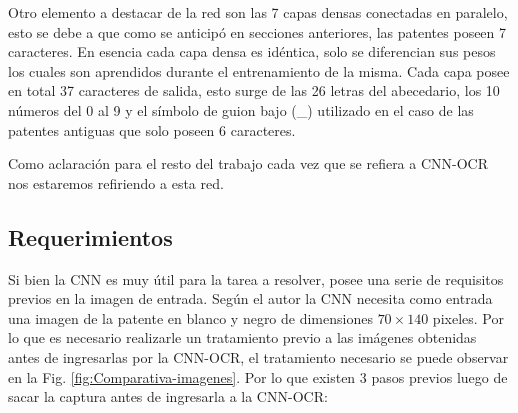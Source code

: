 Otro elemento a destacar de la red son las 7 capas densas conectadas en paralelo, esto se debe a que como se anticipó en secciones anteriores, las patentes poseen 7 caracteres. En esencia cada capa densa es idéntica, solo se diferencian sus pesos los cuales son aprendidos durante el entrenamiento de la misma. Cada capa posee en total 37 caracteres de salida, esto surge de las 26 letras del abecedario, los 10 números del 0 al 9 y el símbolo de guion bajo (\_) utilizado en el caso de las patentes antiguas que solo poseen 6 caracteres.

Como aclaración para el resto del trabajo cada vez que se refiera a CNN-OCR nos estaremos refiriendo a esta red.

\subsection{Requerimientos}

Si bien la CNN es muy útil para la tarea a resolver, posee una serie de requisitos previos en la imagen de entrada. Según el autor la CNN
necesita como entrada una imagen de la patente en blanco y negro de dimensiones $70 \times 140$ pixeles.
Por lo que es necesario realizarle un tratamiento previo a las imágenes obtenidas antes de ingresarlas por la CNN-OCR, el tratamiento necesario
se puede observar en la Fig. \ref{fig:Comparativa-imagenes}. Por lo que existen 3 pasos previos luego de sacar
la captura antes de ingresarla a la CNN-OCR:

